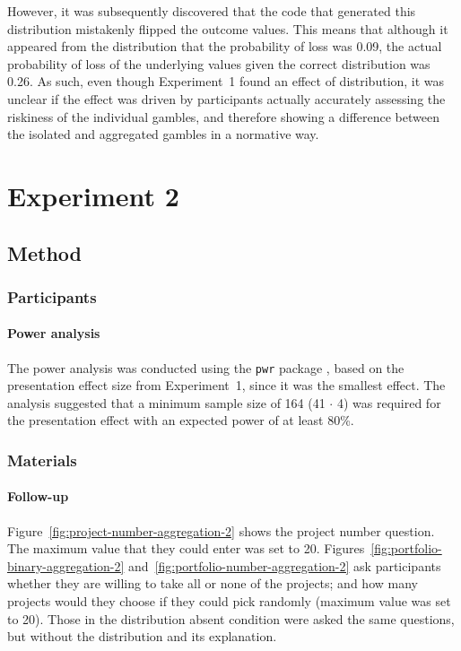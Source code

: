\documentclass[a4paper, nobind, dvipsnames]{templates/ociamthesis}
\theoremstyle{definition}
\theoremstyle{definition}
\theoremstyle{definition}
\theoremstyle{definition}
\theoremstyle{remark}
\begin{document}
However, it was subsequently discovered that the code that generated this
distribution mistakenly flipped the outcome values. This means that although it
appeared from the distribution that the probability of loss was
0.09, the actual probability of loss of the
underlying values given the correct distribution was
0.26. As such, even though Experiment~1
found an effect of distribution, it was unclear if the effect was driven by
participants actually accurately assessing the riskiness of the individual
gambles, and therefore showing a difference between the isolated and aggregated
gambles in a normative way.

\section{Experiment 2}

\subsection{Method}

\subsubsection{Participants}

\hypertarget{power-analysis-aggregation-2}{%
\paragraph{Power analysis}\label{power-analysis-aggregation-2}}

The power analysis was conducted using the \texttt{pwr} package \autocite{champely2020}, based
on the presentation effect size from Experiment~1, since it was the smallest
effect. The analysis suggested that a minimum sample size of
164 (41 \(\cdot\) 4) was required for
the presentation effect with an expected power of at least 80\%.

\subsubsection{Materials}

\hypertarget{follow-up-materials-aggregation-2-appendix}{%
\paragraph{Follow-up}\label{follow-up-materials-aggregation-2-appendix}}

Figure~\ref{fig:project-number-aggregation-2} shows the project number
question. The maximum value that they could enter was set to 20.
Figures~\ref{fig:portfolio-binary-aggregation-2}
and~\ref{fig:portfolio-number-aggregation-2} ask participants whether they are
willing to take all or none of the projects; and how many projects would they
choose if they could pick randomly (maximum value was set to 20). Those in the
distribution absent condition were asked the same questions, but without the
distribution and its explanation.
\end{document}
